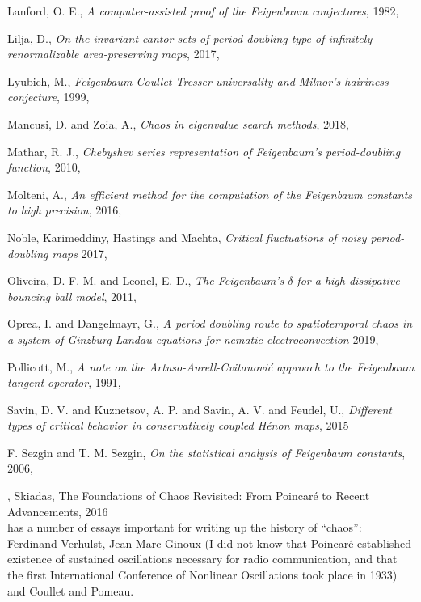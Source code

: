 \begin{description}
{{Lanford}, O. E.},
{\em A computer-assisted proof of the {Feigenbaum} conjectures},
{1982},

{Lilja, D.},
{\em On the invariant cantor sets of period doubling type of infinitely
renormalizable area-preserving maps},
{2017},

{Lyubich, M.},
{\em {Feigenbaum-Coullet-Tresser} universality and {Milnor}'s hairiness conjecture},
{1999},

{Mancusi, D. and Zoia, A.},
{\em Chaos in eigenvalue search methods},
{2018},

{Mathar, R. J.},
{\em {Chebyshev} series representation of {Feigenbaum's} period-doubling function},
{2010},

{Molteni, A.},
{\em An efficient method for the computation of the {Feigenbaum} constants to high precision},
{2016},

Noble, Karimeddiny, Hastings and Machta,
{\em Critical fluctuations of noisy period-doubling maps}
{2017},

{Oliveira, D. F. M. and Leonel, E. D.},
{\em The {Feigenbaum}'s {$\delta$} for a high dissipative bouncing ball model},
{2011},

{Oprea, I. and Dangelmayr, G.},
{\em A period doubling route to spatiotemporal chaos in a system of
{Ginzburg-Landau} equations for nematic electroconvection}
{2019},

{Pollicott, M.},
{\em A note on the {Artuso-Aurell-Cvitanovi{\'c}} approach to the {Feigenbaum} tangent operator},
{1991},

{Savin, D. V. and Kuznetsov, A. P. and Savin, A. V. and Feudel, U.},
{\em Different types of critical behavior in conservatively coupled {H{\'{e}}non} maps},
{2015}

{F. Sezgin and T. M. Sezgin},
{\em On the statistical analysis of {Feigenbaum} constants},
{2006},

,
{Skiadas},
{{The Foundations of Chaos Revisited: From Poincar{\'{e}} to Recent Advancements}},
{2016}
\\
has a number of essays important for writing up the history of ``chaos'':
Ferdinand Verhulst, Jean-Marc Ginoux (I did not know that Poincar\'e
established existence of sustained oscillations necessary for radio
communication, and that the first International Conference of Nonlinear
Oscillations took place in 1933) and
Coullet and Pomeau.


\end{description}
